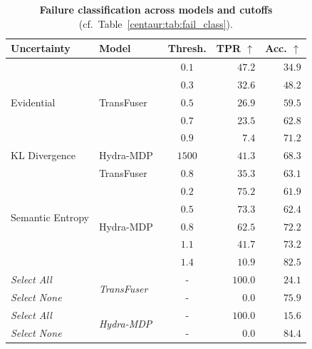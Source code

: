 \begin{table}[t]
  \centering
  \caption[Failure classification across models and cutoffs]{\textbf{Failure classification across models and cutoffs} (cf.\ Table~\ref{centaur:tab:fail_class}).}
  \label{centaur:tab:fail_class_supp}
  \begin{tabular}{l|l|c|rr}
    \toprule
    \textbf{Uncertainty} & \textbf{Model} & \textbf{Thresh.} & \textbf{TPR} $\uparrow$ & \textbf{Acc.} $\uparrow$ \\
    \midrule
    \multirow{5}{*}{Evidential} & \multirow{5}{*}{TransFuser~\cite{chitta2023transfuser}} & $0.1$ & $47.2$ & $34.9$ \\
    & & $0.3$ & $32.6$ & $48.2$ \\
    & & $0.5$ & $26.9$ & $59.5$ \\
    & & $0.7$ & $23.5$ & $62.8$ \\
    & & $0.9$ & $7.4$ & $71.2$ \\
    \midrule
    KL Divergence & Hydra-MDP~\cite{li2024hydramdp} & $1500$ & $41.3$ & $68.3$ \\
    \midrule
    \multirow{6}{*}{Semantic Entropy} & TransFuser~\cite{chitta2023transfuser} & $0.8$ & $35.3$ & $63.1$ \\
    \cmidrule{2-5}
    & \multirow{5}{*}{Hydra-MDP~\cite{li2024hydramdp}} & $0.2$ & $75.2$ & $61.9$ \\
    & & $0.5$ & $73.3$ & $62.4$ \\
    & & $0.8$ & $62.5$ & $72.2$ \\
    & & $1.1$ & $41.7$ & $73.2$ \\
    & & $1.4$ & $10.9$ & $82.5$ \\
    \midrule
    \textit{Select All} & \multirow{2}{*}{\textit{TransFuser}~\cite{chitta2023transfuser}} & - & $\mathit{100.0}$ & $\mathit{24.1}$ \\
    \textit{Select None} & & - & $\mathit{0.0}$ & $\mathit{75.9}$ \\
    \midrule
    \textit{Select All} & \multirow{2}{*}{\textit{Hydra-MDP}~\cite{li2024hydramdp}} & - & $\mathit{100.0}$ & $\mathit{15.6}$ \\
    \textit{Select None} & & - & $\mathit{0.0}$ & $\mathit{84.4}$ \\
    \bottomrule
  \end{tabular}
\end{table}

